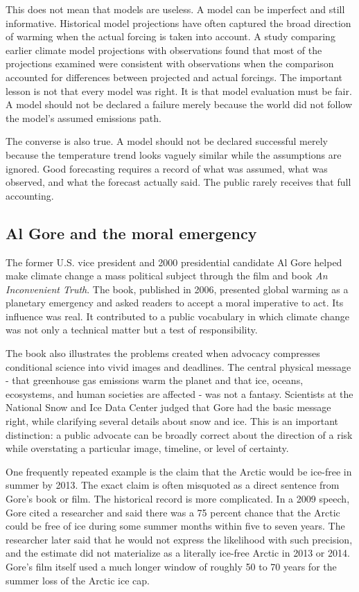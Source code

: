 ﻿\documentclass[12pt,a4paper]{book}
\begin{document}
This does not mean that models are useless. A model can be imperfect and still informative. Historical model projections have often captured the broad direction of warming when the actual forcing is taken into account. A study comparing earlier climate model projections with observations found that most of the projections examined were consistent with observations when the comparison accounted for differences between projected and actual forcings. The important lesson is not that every model was right. It is that model evaluation must be fair. A model should not be declared a failure merely because the world did not follow the model's assumed emissions path.

The converse is also true. A model should not be declared successful merely because the temperature trend looks vaguely similar while the assumptions are ignored. Good forecasting requires a record of what was assumed, what was observed, and what the forecast actually said. The public rarely receives that full accounting.

\subsection{Al Gore and the moral emergency}
The former U.S. vice president and 2000 presidential candidate Al Gore helped make climate change a mass political subject through the film and book \emph{An Inconvenient Truth}. The book, published in 2006, presented global warming as a planetary emergency and asked readers to accept a moral imperative to act. Its influence was real. It contributed to a public vocabulary in which climate change was not only a technical matter but a test of responsibility. \cite{Gore2006}

The book also illustrates the problems created when advocacy compresses conditional science into vivid images and deadlines. The central physical message - that greenhouse gas emissions warm the planet and that ice, oceans, ecosystems, and human societies are affected - was not a fantasy. Scientists at the National Snow and Ice Data Center judged that Gore had the basic message right, while clarifying several details about snow and ice. This is an important distinction: a public advocate can be broadly correct about the direction of a risk while overstating a particular image, timeline, or level of certainty. \cite{NSIDC2006Gore}

One frequently repeated example is the claim that the Arctic would be ice-free in summer by 2013. The exact claim is often misquoted as a direct sentence from Gore's book or film. The historical record is more complicated. In a 2009 speech, Gore cited a researcher and said there was a 75 percent chance that the Arctic could be free of ice during some summer months within five to seven years. The researcher later said that he would not express the likelihood with such precision, and the estimate did not materialize as a literally ice-free Arctic in 2013 or 2014. Gore's film itself used a much longer window of roughly 50 to 70 years for the summer loss of the Arctic ice cap. \cite{Putterman2021}
\end{document}
